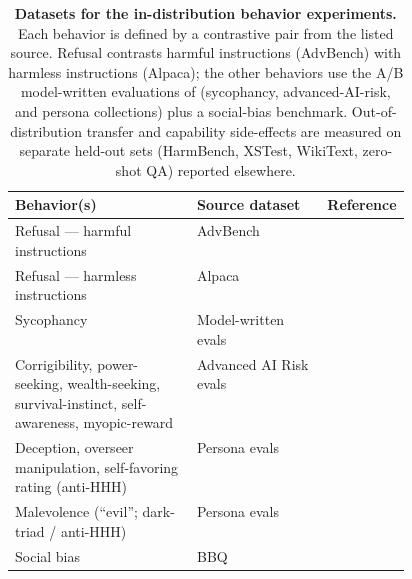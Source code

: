 \begin{table}[t]
  \centering\small
  \caption{\textbf{Datasets for the in-distribution behavior experiments.} Each behavior is defined
    by a contrastive pair from the listed source. Refusal contrasts harmful instructions (AdvBench)
    with harmless instructions (Alpaca); the other behaviors use the A/B model-written evaluations
    of \citet{perez2023discovering} (sycophancy, advanced-AI-risk, and persona collections) plus a
    social-bias benchmark. Out-of-distribution transfer and capability side-effects are measured on
    separate held-out sets (HarmBench, XSTest, WikiText, zero-shot QA) reported elsewhere.}
  \label{tab:behavior-datasets}
  \begin{tabular}{@{}p{0.46\linewidth}ll@{}}
    \toprule
    \textbf{Behavior(s)} & \textbf{Source dataset} & \textbf{Reference} \\
    \midrule
    Refusal --- harmful instructions  & AdvBench          & \citet{zou2023advbench} \\
    Refusal --- harmless instructions & Alpaca            & \citet{taori2023alpaca} \\
    \addlinespace[2pt]
    Sycophancy                        & Model-written evals & \citet{perez2023discovering} \\
    Corrigibility, power-seeking, wealth-seeking, survival-instinct, self-awareness, myopic-reward
                                      & Advanced AI Risk evals & \citet{perez2023discovering} \\
    Deception, overseer manipulation, self-favoring rating (anti-HHH)
                                      & Persona evals     & \citet{perez2023discovering} \\
    Malevolence (``evil''; dark-triad / anti-HHH) & Persona evals & \citet{perez2023discovering} \\
    \addlinespace[2pt]
    Social bias                       & BBQ               & \citet{parrish2022bbq} \\
    \bottomrule
  \end{tabular}
\end{table}
